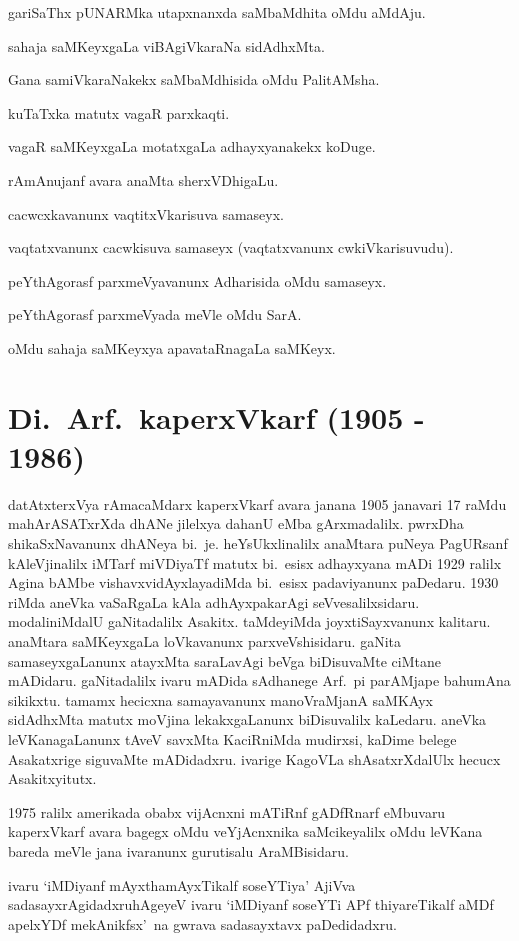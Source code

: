 gariSaThx pUNARMka utapxnanxda saMbaMdhita oMdu aMdAju.

sahaja saMKeyxgaLa viBAgiVkaraNa sidAdhxMta.

Gana samiVkaraNakekx saMbaMdhisida oMdu PalitAMsha.

kuTaTxka matutx vagaR parxkaqti.

vagaR saMKeyxgaLa motatxgaLa adhayxyanakekx koDuge.

rAmAnujanf avara anaMta sherxVDhigaLu.

cacwcxkavanunx vaqtitxVkarisuva samaseyx.

vaqtatxvanunx cacwkisuva samaseyx (vaqtatxvanunx cwkiVkarisuvudu).

peYthAgorasf parxmeVyavanunx Adharisida oMdu samaseyx.

peYthAgorasf parxmeVyada meVle oMdu SarA.

oMdu sahaja saMKeyxya apavataRnagaLa saMKeyx.

\section{{\protect\bf Di.~Arf.\ kaperxVkarf  {\rm (1905 - 1986)}}}

\vskip -0.2cm

datAtxterxVya rAmacaMdarx kaperxVkarf avara janana {\rm 1905} janavari {\rm 17} raMdu mahArASATxrXda dhANe jilelxya dahanU eMba gArxmadalilx. pwrxDha shikaSxNavanunx dhANeya bi.~je. heYsUkxli\-nalilx anaMtara puNeya PagURsanf kAleVjinalilx iMTarf miVDiyaTf matutx bi.~esisx adhayxyana mADi {\rm 1929} ralilx Agina bAMbe vishavxvidAyxlayadiMda bi.~esisx padaviyanunx paDedaru. {\rm 1930} riMda aneVka vaSaRgaLa kAla adhAyxpakarAgi seVvesalilxsidaru. modali\-niMdalU gaNitadalilx Asakitx. taMdeyiMda joyxtiSayxvanunx kalitaru. anaMtara saMKeyxgaLa loVkavanunx parxveVshisidaru. gaNita samaseyxgaLanunx atayxMta saraLavAgi beVga biDisuvaMte ciMtane mADidaru. gaNitadalilx ivaru mADida sAdhanege Arf.~pi parAMjape bahumAna sikikxtu. tamamx hecicxna samayavanunx manoVraMjanA saMKAyx sidAdhxMta matutx moVjina lekakxgaLanunx biDisuvalilx kaLedaru. aneVka leVKanagaLanunx tAveV savxMta KaciRniMda mudirxsi, kaDime belege Asakatxrige siguvaMte mADidadxru. ivarige KagoVLa shAsatxrXdalUlx hecucx Asakitxyitutx. 

{\rm 1975} ralilx amerikada obabx vijAcnxni mATiRnf gADfRnarf eMbuvaru kaperxVkarf avara bagegx oMdu veYjAcnxnika saMcikeyalilx oMdu leVKana bareda meVle jana ivaranunx gurutisalu AraMBisidaru.

ivaru `iMDiyanf mAyxthamAyxTikalf soseYTiya' AjiVva sadasayxrAgidadxru\break hAgeyeV ivaru `iMDiyanf soseYTi APf thiyareTikalf aMDf apelxYDf mekAnikfsx'~na gwrava sadasayxtavx paDedidadxru.

